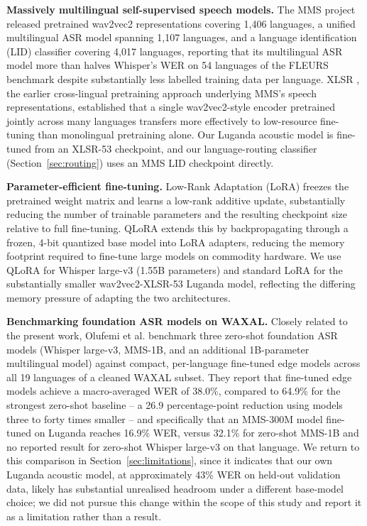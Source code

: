 \documentclass[11pt]{article}
\begin{document}
\textbf{Massively multilingual self-supervised speech models.} The MMS project \cite{pratap2024mms} released pretrained wav2vec2 representations covering 1{,}406 languages, a unified multilingual ASR model spanning 1{,}107 languages, and a language identification (LID) classifier covering 4{,}017 languages, reporting that its multilingual ASR model more than halves Whisper's WER on 54 languages of the FLEURS benchmark despite substantially less labelled training data per language. XLSR \cite{conneau2021xlsr}, the earlier cross-lingual pretraining approach underlying MMS's speech representations, established that a single wav2vec2-style encoder pretrained jointly across many languages transfers more effectively to low-resource fine-tuning than monolingual pretraining alone. Our Luganda acoustic model is fine-tuned from an XLSR-53 checkpoint, and our language-routing classifier (Section~\ref{sec:routing}) uses an MMS LID checkpoint directly.

\textbf{Parameter-efficient fine-tuning.} Low-Rank Adaptation (LoRA) \cite{hu2022lora} freezes the pretrained weight matrix and learns a low-rank additive update, substantially reducing the number of trainable parameters and the resulting checkpoint size relative to full fine-tuning. QLoRA \cite{dettmers2023qlora} extends this by backpropagating through a frozen, 4-bit quantized base model into LoRA adapters, reducing the memory footprint required to fine-tune large models on commodity hardware. We use QLoRA for Whisper large-v3 (1.55B parameters) and standard LoRA for the substantially smaller wav2vec2-XLSR-53 Luganda model, reflecting the differing memory pressure of adapting the two architectures.

\textbf{Benchmarking foundation ASR models on WAXAL.} Closely related to the present work, Olufemi et al. \cite{olufemi2026waxalnet} benchmark three zero-shot foundation ASR models (Whisper large-v3, MMS-1B, and an additional 1B-parameter multilingual model) against compact, per-language fine-tuned edge models across all 19 languages of a cleaned WAXAL subset. They report that fine-tuned edge models achieve a macro-averaged WER of 38.0\%, compared to 64.9\% for the strongest zero-shot baseline -- a 26.9 percentage-point reduction using models three to forty times smaller -- and specifically that an MMS-300M model fine-tuned on Luganda reaches 16.9\% WER, versus 32.1\% for zero-shot MMS-1B and no reported result for zero-shot Whisper large-v3 on that language. We return to this comparison in Section~\ref{sec:limitations}, since it indicates that our own Luganda acoustic model, at approximately 43\% WER on held-out validation data, likely has substantial unrealised headroom under a different base-model choice; we did not pursue this change within the scope of this study and report it as a limitation rather than a result.
\end{document}
